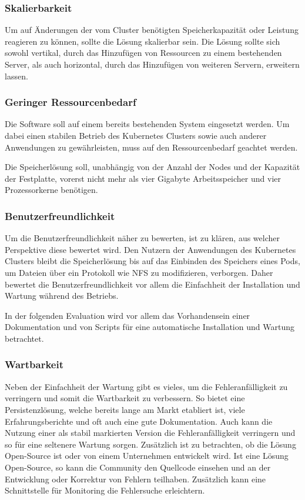 \subsubsection{Skalierbarkeit}
Um auf Änderungen der vom Cluster benötigten Speicherkapazität oder Leistung reagieren zu können, sollte die Lösung skalierbar sein. Die Lösung sollte sich sowohl vertikal, durch das Hinzufügen von Ressourcen zu einem bestehenden Server, als auch horizontal, durch das Hinzufügen von weiteren Servern, erweitern lassen.

\subsubsection{Geringer Ressourcenbedarf}
Die Software soll auf einem bereits bestehenden System eingesetzt werden. Um dabei einen stabilen Betrieb des Kubernetes Clusters sowie auch anderer Anwendungen zu gewährleisten, muss auf den Ressourcenbedarf geachtet werden. \medskip 

Die Speicherlösung soll, unabhängig von der Anzahl der Nodes und der Kapazität der Festplatte, vorerst nicht mehr als vier Gigabyte Arbeitsspeicher und vier Prozessorkerne benötigen.

\subsubsection{Benutzerfreundlichkeit}
Um die Benutzerfreundlichkeit näher zu bewerten, ist zu klären, aus welcher Perspektive diese bewertet wird. Den Nutzern der Anwendungen des Kubernetes Clusters bleibt die Speicherlösung bis auf das Einbinden des Speichers eines Pods, um Dateien über ein Protokoll wie \ac{NFS} zu modifizieren, verborgen. Daher bewertet die Benutzerfreundlichkeit vor allem die Einfachheit der Installation und Wartung während des Betriebs.  \medskip

In der folgenden Evaluation wird vor allem das Vorhandensein einer Dokumentation und von Scripts für eine automatische Installation und Wartung betrachtet. 

\subsubsection{Wartbarkeit}
Neben der Einfachheit der Wartung gibt es vieles, um die Fehleranfälligkeit zu verringern und somit die Wartbarkeit zu verbessern. So bietet eine Persistenzlösung, welche bereits lange am Markt etabliert ist, viele Erfahrungsberichte und oft auch eine gute Dokumentation. Auch kann die Nutzung einer als stabil markierten Version die Fehleranfälligkeit verringern und so für eine seltenere Wartung sorgen. Zusätzlich ist zu betrachten, ob die Lösung Open-Source ist oder von einem Unternehmen entwickelt wird. Ist eine Lösung Open-Source, so kann die Community den Quellcode einsehen und an der Entwicklung oder Korrektur von Fehlern teilhaben. Zusätzlich kann eine Schnittstelle für Monitoring die Fehlersuche erleichtern.

